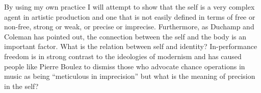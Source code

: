 \documentclass[a4paper]{article}
\begin{document}
By using my own practice I will attempt to show that the self is a very complex agent in artistic production and one that is not easily defined in terms of free or non-free, strong or weak, or precise or imprecise. Furthermore, as Duchamp and Coleman has pointed out, the connection between the self and the body is an important factor. What is the relation between self and identity? In-performance freedom is in strong contrast to the ideologies of modernism and has caused people like Pierre Boulez to dismiss those who advocate chance operations in music as being ``meticulous in imprecision'' but what is the meaning of precision in the self?


\end{document}
